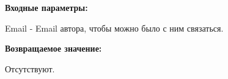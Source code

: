 \textbf{Входные параметры:}

Email - Email автора, чтобы можно было с ним связаться.

\textbf{Возвращаемое значение:}

Отсутствуют.